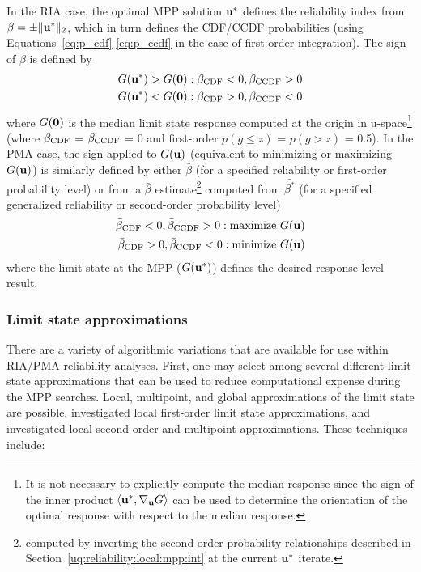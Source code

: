 In the RIA case, the optimal MPP solution ${\bf u}^*$ defines the
reliability index from $\beta = \pm \|{\bf u}^*\|_2$, which in turn
defines the CDF/CCDF probabilities (using
Equations~\ref{eq:p_cdf}-\ref{eq:p_ccdf} in the case of first-order
integration).  The sign of $\beta$ is defined by
\begin{eqnarray}
G({\bf u}^*) > G({\bf 0}): \beta_{\rm CDF} < 0, \beta_{\rm CCDF} > 0 \\
G({\bf u}^*) < G({\bf 0}): \beta_{\rm CDF} > 0, \beta_{\rm CCDF} < 0
\end{eqnarray}
\noindent where $G({\bf 0})$ is the median limit state response computed 
at the origin in u-space\footnote{It is not necessary to explicitly compute
the median response since the sign of the inner product 
$\langle {\bf u}^*, \nabla_{\bf u} G \rangle$
can be used to determine the orientation of the optimal response with 
respect to the median response.} (where $\beta_{\rm CDF}$ = $\beta_{\rm CCDF}$ = 0 
and first-order $p(g \le z)$ = $p(g > z)$ = 0.5).  In the PMA case, the 
sign applied to $G({\bf u})$ (equivalent to minimizing or maximizing 
$G({\bf u})$) is similarly defined by either $\bar{\beta}$ (for a specified 
reliability or first-order probability level) or from a $\bar{\beta}$ 
estimate\footnote{computed by inverting the second-order probability 
relationships described in Section~\ref{uq:reliability:local:mpp:int} at 
the current ${\bf u}^*$ iterate.} computed from $\bar{\beta^*}$ (for a 
specified generalized reliability or second-order probability level)
\begin{eqnarray}
\bar{\beta}_{\rm CDF} < 0, \bar{\beta}_{\rm CCDF} > 0: {\rm maximize \ } G({\bf u}) \\
\bar{\beta}_{\rm CDF} > 0, \bar{\beta}_{\rm CCDF} < 0: {\rm minimize \ } G({\bf u})
\end{eqnarray}
where the limit state at the MPP ($G({\bf u}^*)$) defines the desired
response level result.

\subsubsection{Limit state approximations} \label{uq:reliability:local:mpp:approx}

There are a variety of algorithmic variations that are available for
use within RIA/PMA reliability analyses.  First, one may select among
several different limit state approximations that can be used to
reduce computational expense during the MPP searches.  Local,
multipoint, and global approximations of the limit state are possible.
\cite{Eld05} investigated local first-order limit state 
approximations, and \cite{Eld06a} investigated local second-order
and multipoint approximations.  These techniques include:

